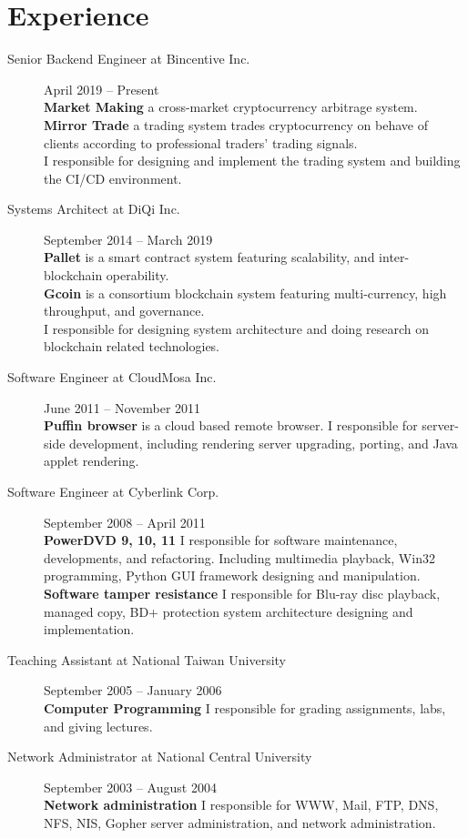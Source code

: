 \documentclass[10pt,a4paper]{article}
\newcommand{\br}{\hfill\\}
\begin{document}
\section*{Experience}
\begin{description}

\item[Senior Backend Engineer at Bincentive Inc.]
April 2019 -- Present\br
\textbf{Market Making} a cross-market cryptocurrency arbitrage system.\br
\textbf{Mirror Trade} a trading system trades cryptocurrency on behave of clients according to professional traders' trading signals.\br
I responsible for designing and implement the trading system and building the CI/CD environment.

\item[Systems Architect at DiQi Inc.]
September 2014 -- March 2019\br
\textbf{Pallet} is a smart contract system featuring scalability, and inter-blockchain operability.\br
\textbf{Gcoin} is a consortium blockchain system featuring multi-currency, high throughput, and governance.\br
I responsible for designing system architecture and doing research on blockchain related technologies.

\item[Software Engineer at CloudMosa Inc.]
June 2011 -- November 2011\br
\textbf{Puffin browser} is a cloud based remote browser.
I responsible for server-side development, including rendering server upgrading, porting, and Java applet rendering.

\item[Software Engineer at Cyberlink Corp.]
September 2008 -- April 2011\br
\textbf{PowerDVD 9, 10, 11} I responsible for software maintenance, developments, and refactoring.
Including multimedia playback, Win32 programming, Python GUI framework designing and manipulation.\br
\textbf{Software tamper resistance} I responsible for Blu-ray disc playback, managed copy, BD+ protection system architecture designing and implementation.

\item[Teaching Assistant at National Taiwan University]
September 2005 -- January 2006\br
\textbf{Computer Programming} I responsible for grading assignments, labs, and giving lectures.

\item[Network Administrator at National Central University]
September 2003 -- August 2004\br
\textbf{Network administration} I responsible for WWW, Mail, FTP, DNS, NFS, NIS, Gopher server administration, and network administration.
\end{description}
\end{document}
